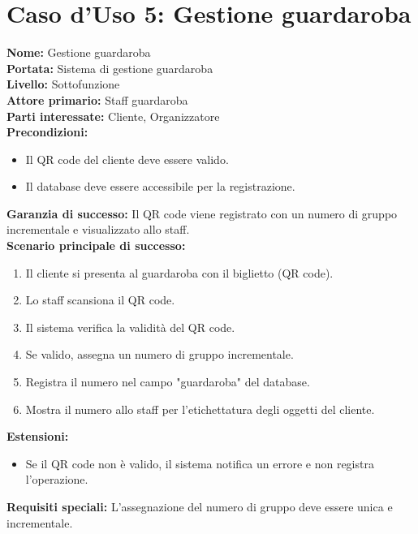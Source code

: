 \documentclass[a4paper,12pt]{article}
\begin{document}
\section*{\textcolor{sectioncolor}{Caso d'Uso 5: Gestione guardaroba}}
\textcolor{textcolor}{
\textbf{Nome:} Gestione guardaroba\\
\textbf{Portata:} Sistema di gestione guardaroba\\
\textbf{Livello:} Sottofunzione\\
\textbf{Attore primario:} Staff guardaroba\\
\textbf{Parti interessate:} Cliente, Organizzatore\\
\textbf{Precondizioni:}
\begin{itemize}
    \item Il QR code del cliente deve essere valido.
    \item Il database deve essere accessibile per la registrazione.
\end{itemize}
\textbf{Garanzia di successo:} Il QR code viene registrato con un numero di gruppo incrementale e visualizzato allo staff.\\
\textbf{Scenario principale di successo:}
\begin{enumerate}
    \item Il cliente si presenta al guardaroba con il biglietto (QR code).
    \item Lo staff scansiona il QR code.
    \item Il sistema verifica la validità del QR code.
    \item Se valido, assegna un numero di gruppo incrementale.
    \item Registra il numero nel campo "guardaroba" del database.
    \item Mostra il numero allo staff per l'etichettatura degli oggetti del cliente.
\end{enumerate}
\textbf{Estensioni:}
\begin{itemize}
    \item  Se il QR code non è valido, il sistema notifica un errore e non registra l'operazione.
\end{itemize}
\textbf{Requisiti speciali:} L'assegnazione del numero di gruppo deve essere unica e incrementale.
}
\end{document}
